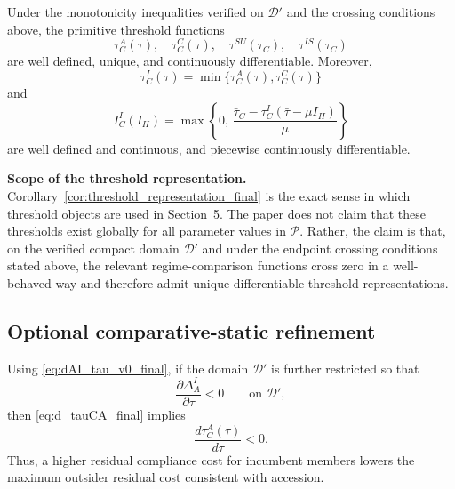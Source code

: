 \begin{corollary}
\label{cor:threshold_representation_final}
Under the monotonicity inequalities verified on $\mathcal D'$ and the crossing
conditions above, the primitive threshold functions
\[
\tau_C^A(\tau),\quad \tau_C^C(\tau),\quad \tau^{SU}(\tau_C),\quad \tau^{IS}(\tau_C)
\]
are well defined, unique, and continuously differentiable. Moreover,
\[
\tau_C^{I}(\tau)=\min\{\tau_C^A(\tau),\tau_C^C(\tau)\}
\]
and
\[
I_C^{I}(I_H)
=
\max\left\{
0,\,
\frac{\bar\tau_C-\tau_C^{I}(\bar\tau-\mu I_H)}{\mu}
\right\}
\]
are well defined and continuous, and piecewise continuously differentiable.
\end{corollary}

\medskip
\noindent\textbf{Scope of the threshold representation.}
Corollary~\ref{cor:threshold_representation_final} is the exact sense in which
threshold objects are used in Section~5. The paper does not claim that these
thresholds exist globally for all parameter values in $\mathcal P$. Rather,
the claim is that, on the verified compact domain $\mathcal D'$ and under the
endpoint crossing conditions stated above, the relevant regime-comparison
functions cross zero in a well-behaved way and therefore admit unique
differentiable threshold representations.

\subsection{Optional comparative-static refinement}

Using \eqref{eq:dAI_tau_v0_final}, if the domain $\mathcal D'$ is further
restricted so that
\[
\frac{\partial \Delta_A^I}{\partial \tau}<0
\qquad\text{on }\mathcal D',
\]
then \eqref{eq:d_tauCA_final} implies
\[
\frac{d\tau_C^A(\tau)}{d\tau}<0.
\]
Thus, a higher residual compliance cost for incumbent members lowers the
maximum outsider residual cost consistent with accession.
